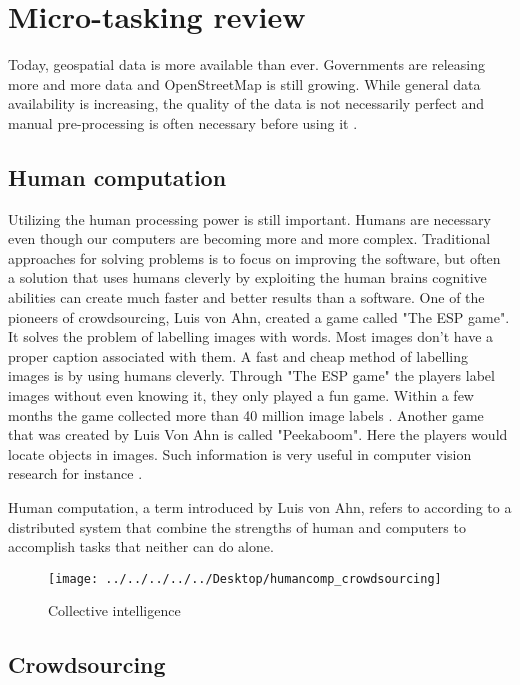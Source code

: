 \chapter{Micro-tasking review}

Today, geospatial data is more available than ever. Governments are releasing more and more data and OpenStreetMap is still growing. While general data availability is increasing, the quality of the data is not necessarily perfect and manual pre-processing is often necessary before using it \citep{Difallah2015}.  

\section{Human computation}\label{sec:humancomputation}
Utilizing the human processing power is still important. Humans are necessary even though our computers are becoming more and more complex. Traditional approaches for solving problems is to focus on improving the software, but often a solution that uses humans cleverly by exploiting the human brains cognitive abilities can create much faster and better results than a software. One of the pioneers of crowdsourcing, Luis von Ahn, created a game called "The ESP game". It solves the problem of labelling images with words. Most images don't have a proper caption associated with them. A fast and cheap method of labelling images is by using humans cleverly. Through "The ESP game" the players label images without even knowing it, they only played a fun game. Within a few months the game collected more than 40 million image labels \citep{VonAhn2008}. Another game that was created by Luis Von Ahn is called "Peekaboom". Here the players would locate objects in images. Such information is very useful in computer vision research for instance \citep{VonAhn2008}.   

Human computation, a term introduced by Luis von Ahn, refers to according to \cite{Quinn2011} a distributed system that combine the strengths of human and computers to accomplish tasks that neither can do alone. 

\begin{figure}[H]
	\centering
	\texttt{[image: ../../../../../Desktop/humancomp\_crowdsourcing]}
	\caption{Collective intelligence \citep{Quinn2011}}
	\label{fig:humancompcrowdsourcing}
\end{figure}


\section{Crowdsourcing}\label{sec:crowdsourcing}

